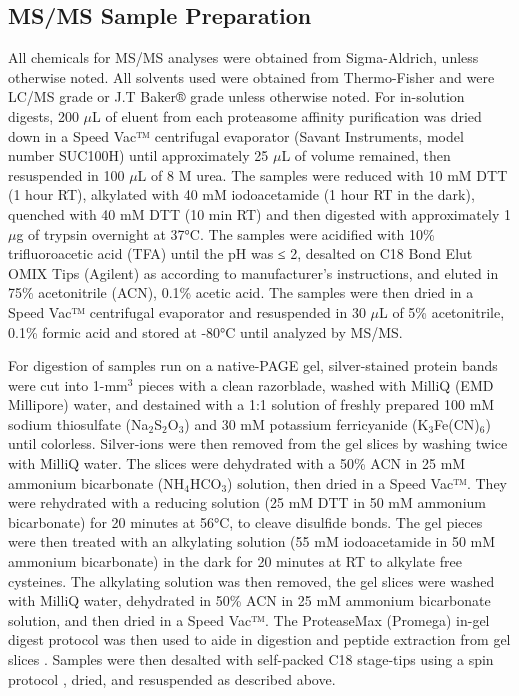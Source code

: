 \subsection{MS/MS Sample Preparation}
	All chemicals for MS/MS analyses were obtained from Sigma-Aldrich, unless otherwise noted. All solvents used were obtained from Thermo-Fisher and were LC/MS grade or J.T Baker® grade unless otherwise noted. For in-solution digests, 200 $\mu$L of eluent from each proteasome affinity purification was dried down in a Speed Vac™ centrifugal evaporator (Savant Instruments, model number SUC100H) until approximately 25 $\mu$L of volume remained, then resuspended in 100 $\mu$L of 8 M urea. The samples were reduced with 10 mM DTT (1 hour RT), alkylated with 40 mM iodoacetamide (1 hour RT in the dark), quenched with 40 mM DTT (10 min RT) and then digested with approximately 1 $\mu$g of trypsin overnight at 37°C. The samples were acidified with 10\% trifluoroacetic acid (TFA) until the pH was ≤ 2, desalted on C18 Bond Elut OMIX Tips (Agilent) as according to manufacturer's instructions, and eluted in 75\% acetonitrile (ACN), 0.1\% acetic acid. The samples were then dried in a Speed Vac™ centrifugal evaporator and resuspended in 30 $\mu$L of 5\% acetonitrile, 0.1\% formic acid and stored at -80°C until analyzed by MS/MS. 
	
For digestion of samples run on a native-PAGE gel, silver-stained protein bands were cut into 1-mm$^{3}$ pieces with a clean razorblade, washed with MilliQ (EMD Millipore) water, and destained with a 1:1 solution of freshly prepared 100 mM sodium thiosulfate (Na$_{2}$S$_{2}$O$_{3}$) and 30 mM potassium ferricyanide (K$_{3}$Fe(CN)$_{6}$) until colorless. Silver-ions were then removed from the gel slices by washing twice with MilliQ water. The slices were dehydrated with a 50\% ACN in 25 mM ammonium bicarbonate (NH$_{4}$HCO$_{3}$) solution, then dried in a Speed Vac™. They were rehydrated with a reducing solution (25 mM DTT in 50 mM ammonium bicarbonate) for 20 minutes at 56°C, to cleave disulfide bonds. The gel pieces were then treated with an alkylating solution (55 mM iodoacetamide in 50 mM ammonium bicarbonate) in the dark for 20 minutes at RT to alkylate free cysteines. The alkylating solution was then removed, the gel slices were washed with MilliQ water, dehydrated in 50\% ACN in 25 mM ammonium bicarbonate solution, and then dried in a Speed Vac™. The ProteaseMax (Promega) in-gel digest protocol was then used to aide in digestion and peptide extraction from gel slices \citep{saveliev13}. Samples were then desalted with self-packed C18 stage-tips \citep{rappsilber03} using a spin protocol \citep{yu14} , dried, and resuspended as described above.

